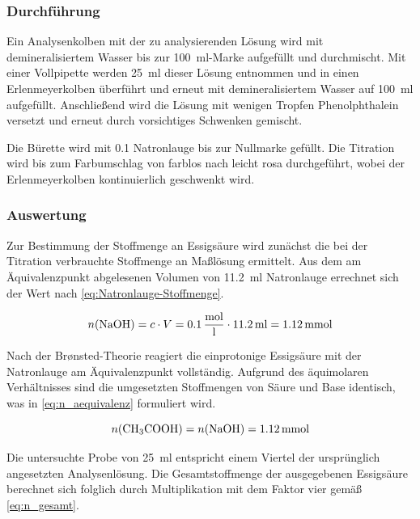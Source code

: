 \subsubsection{Durchführung}
Ein Analysenkolben mit der zu analysierenden Lösung wird mit demineralisiertem Wasser bis zur \SI{100}{ml}-Marke aufgefüllt und durchmischt. Mit einer Vollpipette werden \SI{25}{ml} dieser Lösung entnommen und in einen Erlenmeyerkolben überführt und erneut mit demineralisiertem Wasser auf \SI{100}{ml} aufgefüllt. Anschließend wird die Lösung mit wenigen Tropfen Phenolphthalein versetzt und erneut durch vorsichtiges Schwenken gemischt.

Die Bürette wird mit \SI{0,1}{} Natronlauge bis zur Nullmarke gefüllt. Die Titration wird bis zum Farbumschlag von farblos nach leicht rosa durchgeführt, wobei der Erlenmeyerkolben kontinuierlich geschwenkt wird.

\subsubsection{Auswertung}

Zur Bestimmung der Stoffmenge an Essigsäure wird zunächst die bei der Titration verbrauchte Stoffmenge an Maßlösung ermittelt. Aus dem am Äquivalenzpunkt abgelesenen Volumen von \SI{11,2}{ml} Natronlauge errechnet sich der Wert nach \eqref{eq:Natronlauge-Stoffmenge}.

\begin{equation}
    n(\ce{NaOH}) = c \cdot V = \SI{0,1}{\frac{\mole}{l}} \cdot \SI{11,2}{ml} = \SI{1,12}{\milli\mole}
    \label{eq:Natronlauge-Stoffmenge}
\end{equation}

Nach der Brønsted-Theorie reagiert die einprotonige Essigsäure mit der Natronlauge am Äquivalenzpunkt vollständig. Aufgrund des äquimolaren Verhältnisses sind die umgesetzten Stoffmengen von Säure und Base identisch, was in \eqref{eq:n_aequivalenz} formuliert wird. \cite{mortimer_muller}

\begin{equation}
    n(\ce{CH3COOH}) = n(\ce{NaOH}) = \SI{1,12}{\milli\mole}
    \label{eq:n_aequivalenz}
\end{equation}

Die untersuchte Probe von \SI{25}{ml} entspricht einem Viertel der ursprünglich angesetzten Analysenlösung. Die Gesamtstoffmenge der ausgegebenen Essigsäure berechnet sich folglich durch Multiplikation mit dem Faktor vier gemäß \eqref{eq:n_gesamt}.

